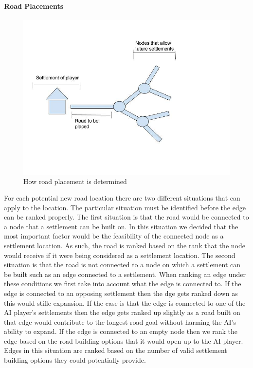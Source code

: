 \documentclass[a4paper,doc,draftfirst]{apa6}
\begin{document}
\paragraph{Road Placements}
\begin{figure}[hbtp]
\includegraphics[width=\textwidth]{AIRoadPlacement}
\caption{How road placement is determined}
\end{figure}
For each potential new road location there are two different situations that can apply to the location. The particular situation must be identified before the edge can be ranked properly.    
 The first situation is that the road would be connected to a node that a settlement can be built on. In this situation we decided that the most important factor would be the feasibility of the connected node as a settlement location. As such, the road is ranked based on the rank that the node would receive if it were being considered as a settlement location.
The second situation is that the road is not connected to a node on which a settlement can be built such as an edge connected to a settlement. When ranking an edge under these conditions we first take into account what the edge is connected to. If the edge is connected to an opposing settlement then the dge gets ranked down as this would stifle expansion. If the case is that the edge is connected to one of the AI player’s settlements then the edge gets ranked up slightly as a road built on that edge would contribute to the longest road goal without harming the AI’s ability to expand.  If the edge is connected to an empty node then we rank the edge based on the road building options that it would open up to the AI player. Edges in this situation are ranked based on the number of valid settlement building options they could potentially provide.
\end{document}
